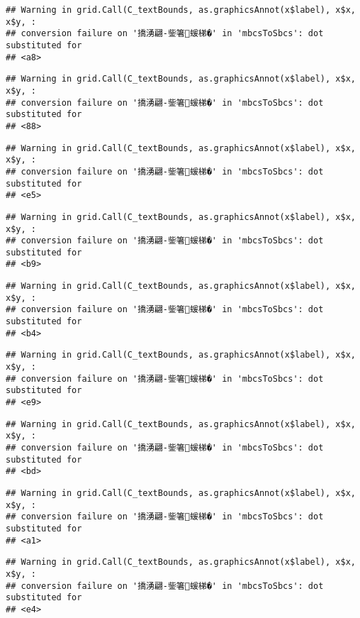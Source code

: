 \documentclass[
]{article}
\begin{document}
\begin{verbatim}
## Warning in grid.Call(C_textBounds, as.graphicsAnnot(x$label), x$x, x$y, :
## conversion failure on '撟湧翩-鈭箸蝯梯�' in 'mbcsToSbcs': dot substituted for
## <a8>
\end{verbatim}

\begin{verbatim}
## Warning in grid.Call(C_textBounds, as.graphicsAnnot(x$label), x$x, x$y, :
## conversion failure on '撟湧翩-鈭箸蝯梯�' in 'mbcsToSbcs': dot substituted for
## <88>
\end{verbatim}

\begin{verbatim}
## Warning in grid.Call(C_textBounds, as.graphicsAnnot(x$label), x$x, x$y, :
## conversion failure on '撟湧翩-鈭箸蝯梯�' in 'mbcsToSbcs': dot substituted for
## <e5>
\end{verbatim}

\begin{verbatim}
## Warning in grid.Call(C_textBounds, as.graphicsAnnot(x$label), x$x, x$y, :
## conversion failure on '撟湧翩-鈭箸蝯梯�' in 'mbcsToSbcs': dot substituted for
## <b9>
\end{verbatim}

\begin{verbatim}
## Warning in grid.Call(C_textBounds, as.graphicsAnnot(x$label), x$x, x$y, :
## conversion failure on '撟湧翩-鈭箸蝯梯�' in 'mbcsToSbcs': dot substituted for
## <b4>
\end{verbatim}

\begin{verbatim}
## Warning in grid.Call(C_textBounds, as.graphicsAnnot(x$label), x$x, x$y, :
## conversion failure on '撟湧翩-鈭箸蝯梯�' in 'mbcsToSbcs': dot substituted for
## <e9>
\end{verbatim}

\begin{verbatim}
## Warning in grid.Call(C_textBounds, as.graphicsAnnot(x$label), x$x, x$y, :
## conversion failure on '撟湧翩-鈭箸蝯梯�' in 'mbcsToSbcs': dot substituted for
## <bd>
\end{verbatim}

\begin{verbatim}
## Warning in grid.Call(C_textBounds, as.graphicsAnnot(x$label), x$x, x$y, :
## conversion failure on '撟湧翩-鈭箸蝯梯�' in 'mbcsToSbcs': dot substituted for
## <a1>
\end{verbatim}

\begin{verbatim}
## Warning in grid.Call(C_textBounds, as.graphicsAnnot(x$label), x$x, x$y, :
## conversion failure on '撟湧翩-鈭箸蝯梯�' in 'mbcsToSbcs': dot substituted for
## <e4>
\end{verbatim}
\end{document}
